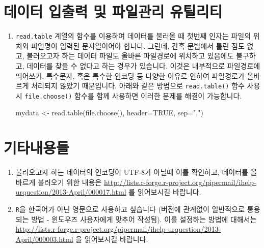



%
%

\section{데이터 입출력 및 파일관리 유틸리티}
\begin{enumerate}
\item \texttt{read.table} 계열의 함수를 이용하여 데이터를 불러올 때 첫번째 인자는 파일의 위치와 파일명이 입력된 문자열이어야 합니다.
그런데, 간혹 문법에서 틀린 점도 없고, 불러오고자 하는 데이터 파일도 올바른 파일경로에 위치하고 있음에도 불구하고,
데이터를 찾을 수 없다고 하는 경우가 있습니다.
이것은 내부적으로 파일경로에 띄어쓰기, 특수문자, 혹은 특수한 인코딩 등 다양한 이유로 인하여 파일경로가 올바르게 처리되지 않았기 때문입니다.
아래와 같은 방법으로 \texttt{read.table()} 함수 사용시 \texttt{file.choose()} 함수를 함께 사용하면 이러한 문제를 해결이 가능합니다.


\begin{Schunk}
\begin{Soutput}
mydata <- read.table(file.choose(), header=TRUE, sep=",")
\end{Soutput}
\end{Schunk}


\end{enumerate}


%
%

\section{기타내용들}
\begin{enumerate}
\item 불러오고자 하는 데이터의 인코딩이 UTF-8가 아닐때 이를 확인하고, 데이터를 올바르게 불러오기 위한 내용은 \url{http://lists.r-forge.r-project.org/pipermail/ihelp-urquestion/2013-April/000017.html} 를 읽어보시길 바랍니다.

\item \texttt{R}을 한국어가 아닌 영문으로 사용하고 싶습니다 (버전에 관계없이 일반적으로 통용되는 방법 - 윈도우즈 사용자에게 맞추어 작성됨).
이를 설정하는 방법에 대해서는 \url{http://lists.r-forge.r-project.org/pipermail/ihelp-urquestion/2013-April/000003.html} 을 읽어보시길 바랍니다.
\end{enumerate}


